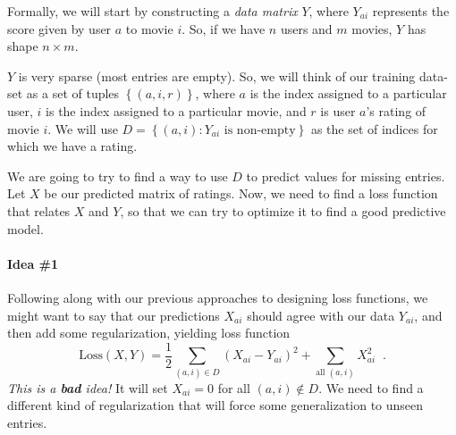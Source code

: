 Formally, we will start by constructing a   {\em data matrix}
$Y$, where $Y_{ai}$ represents the score given by user $a$ to movie
$i$. So, if we have $n$ users and $m$ movies, $Y$ has shape
$n \times m$.

\begin{center}
\end{center}

$Y$ is very sparse (most entries are empty).    So, we will think of our
training data-set as a set of tuples $\left\{(a,i,r)\right\}$,
where $a$ is the index assigned to a particular user, $i$ is the index
assigned to a particular movie, and $r$ is user $a$'s rating of movie
$i$. We will use $D = \left\{(a,i): Y_{ai} \text{ is non-empty}\right\}$
as the set of indices for which we have a rating.

We are going to try to find a way to use $D$ to predict values for
missing entries. Let $X$ be our predicted matrix of ratings.  Now, we
need to find a loss function that relates $X$ and $Y$, so that we can
try to optimize it to find a good predictive model.

\paragraph*{Idea \#1}
Following along with our previous approaches to designing loss
functions, we might want to say that our predictions $X_{ai}$ should
agree with our data $Y_{ai}$, and then add some regularization,
yielding loss function
\[\text{Loss}\text{}(X, Y) = \frac{1}{2} \sum_{(a,i) \in D}
  (X_{ai}-Y_{ai})^2 + \sum_{\text{all } (a,i)}X_{ai}^2\;\;.\]
{\em This is a {\bf bad} idea!}  It will set $X_{ai} = 0$ for all $(a,
  i) \not \in D$.
We need to find a different kind of regularization that will force
some generalization to unseen entries.

